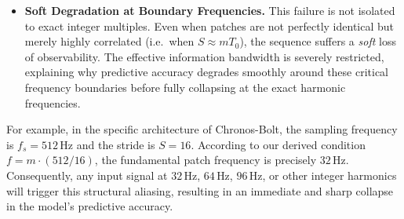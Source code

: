 \begin{itemize}
	\item \textbf{Soft Degradation at Boundary Frequencies.}
	This failure is not isolated to exact integer multiples.
	Even when patches are not perfectly identical but merely highly correlated
	(i.e.\ when $S \approx m T_0$), the sequence suffers a \emph{soft} loss of
	observability.
	The effective information bandwidth is severely restricted, explaining why
	predictive accuracy degrades smoothly around these critical frequency boundaries
	before fully collapsing at the exact harmonic frequencies.
\end{itemize}

\noindent For example, in the specific architecture of Chronos-Bolt, the sampling frequency
is $f_s = 512\,\text{Hz}$ and the stride is $S = 16$.
According to our derived condition $f = m \cdot (512/16)$, the fundamental patch frequency
is precisely $32\,\text{Hz}$.
Consequently, any input signal at $32\,\text{Hz}$, $64\,\text{Hz}$, $96\,\text{Hz}$, or
other integer harmonics will trigger this structural aliasing, resulting in an immediate
and sharp collapse in the model's predictive accuracy.
